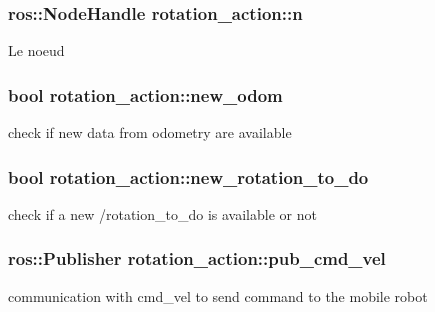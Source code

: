 \subsubsection[{\texorpdfstring{n}{n}}]{\setlength{\rightskip}{0pt plus 5cm}ros\+::\+Node\+Handle rotation\+\_\+action\+::n\hspace{0.3cm}{\ttfamily [private]}}\hypertarget{classrotation__action_a116971b35f73ec6dcb7ca53be6bbf459}{}\label{classrotation__action_a116971b35f73ec6dcb7ca53be6bbf459}
Le noeud 
\subsubsection[{\texorpdfstring{new\+\_\+odom}{new_odom}}]{\setlength{\rightskip}{0pt plus 5cm}bool rotation\+\_\+action\+::new\+\_\+odom\hspace{0.3cm}{\ttfamily [private]}}\hypertarget{classrotation__action_a1c23e033725b84f96b0dcd8669220e99}{}\label{classrotation__action_a1c23e033725b84f96b0dcd8669220e99}
check if new data from odometry are available 
\subsubsection[{\texorpdfstring{new\+\_\+rotation\+\_\+to\+\_\+do}{new_rotation_to_do}}]{\setlength{\rightskip}{0pt plus 5cm}bool rotation\+\_\+action\+::new\+\_\+rotation\+\_\+to\+\_\+do\hspace{0.3cm}{\ttfamily [private]}}\hypertarget{classrotation__action_a6c0a078ebfc8c1679dca30f78c307dfb}{}\label{classrotation__action_a6c0a078ebfc8c1679dca30f78c307dfb}
check if a new /rotation\+\_\+to\+\_\+do is available or not 
\subsubsection[{\texorpdfstring{pub\+\_\+cmd\+\_\+vel}{pub_cmd_vel}}]{\setlength{\rightskip}{0pt plus 5cm}ros\+::\+Publisher rotation\+\_\+action\+::pub\+\_\+cmd\+\_\+vel\hspace{0.3cm}{\ttfamily [private]}}\hypertarget{classrotation__action_a15e1e82d0cd1cbfb2080f567eb638cd7}{}\label{classrotation__action_a15e1e82d0cd1cbfb2080f567eb638cd7}
communication with cmd\+\_\+vel to send command to the mobile robot 
